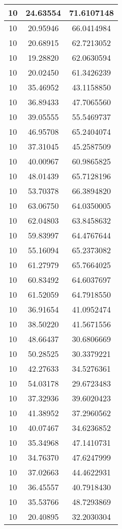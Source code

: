 \documentclass[
]{book}
\begin{document}
\begin{tabular}{c|c|c}
\hline
10 & 24.63554 & 71.6107148\\
\hline
10 & 20.95946 & 66.0414984\\
\hline
10 & 20.68915 & 62.7213052\\
\hline
10 & 19.28820 & 62.0630594\\
\hline
10 & 20.02450 & 61.3426239\\
\hline
10 & 35.46952 & 43.1158850\\
\hline
10 & 36.89433 & 47.7065560\\
\hline
10 & 39.05555 & 55.5469737\\
\hline
10 & 46.95708 & 65.2404074\\
\hline
10 & 37.31045 & 45.2587509\\
\hline
10 & 40.00967 & 60.9865825\\
\hline
10 & 48.01439 & 65.7128196\\
\hline
10 & 53.70378 & 66.3894820\\
\hline
10 & 63.06750 & 64.0350005\\
\hline
10 & 62.04803 & 63.8458632\\
\hline
10 & 59.83997 & 64.4767644\\
\hline
10 & 55.16094 & 65.2373082\\
\hline
10 & 61.27979 & 65.7664025\\
\hline
10 & 60.83492 & 64.6037697\\
\hline
10 & 61.52059 & 64.7918550\\
\hline
10 & 36.91654 & 41.0952474\\
\hline
10 & 38.50220 & 41.5671556\\
\hline
10 & 48.66437 & 30.6806669\\
\hline
10 & 50.28525 & 30.3379221\\
\hline
10 & 42.27633 & 34.5276361\\
\hline
10 & 54.03178 & 29.6723483\\
\hline
10 & 37.32936 & 39.6020423\\
\hline
10 & 41.38952 & 37.2960562\\
\hline
10 & 40.07467 & 34.6236852\\
\hline
10 & 35.34968 & 47.1410731\\
\hline
10 & 34.76370 & 47.6247999\\
\hline
10 & 37.02663 & 44.4622931\\
\hline
10 & 36.45557 & 40.7918430\\
\hline
10 & 35.53766 & 48.7293869\\
\hline
10 & 20.40895 & 32.2030304\\

\end{tabular}
\end{document}
